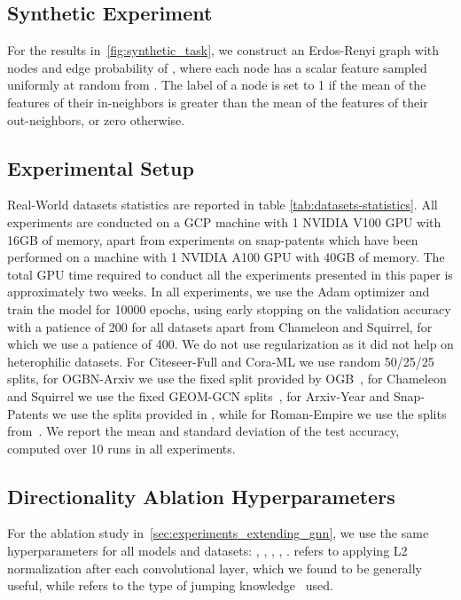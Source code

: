 \documentclass{article}
\theoremstyle{plain}
\theoremstyle{definition}
\theoremstyle{remark}
\begin{document}
\subsection{Synthetic Experiment}  \label{sec:appendix_synthetic_experiment}
For the results in~\cref{fig:synthetic_task}, we construct an Erdos-Renyi graph with  nodes and edge probability of , where each node has a scalar feature sampled uniformly at random from . The label of a node is set to 1 if the mean of the features of their in-neighbors is greater than the mean of the features of their out-neighbors, or zero otherwise. 

\subsection{Experimental Setup} \label{app:experimental_setup}
Real-World datasets statistics are reported in table \ref{tab:datasets-statistics}.
All experiments are conducted on a GCP machine with 1 NVIDIA V100 GPU with 16GB of memory, apart from experiments on snap-patents which have been performed on a machine with 1 NVIDIA A100 GPU with 40GB of memory. The total GPU time required to conduct all the experiments presented in this paper is approximately two weeks.
In all experiments, we use the Adam optimizer and train the model for 10000 epochs, using early stopping on the validation accuracy with a patience of 200 for all datasets apart from Chameleon and Squirrel, for which we use a patience of 400. We do not use regularization as it did not help on heterophilic datasets. For Citeseer-Full and Cora-ML we use random 50/25/25 splits, for OGBN-Arxiv we use the fixed split provided by OGB~\cite{hu2020ogb}, for Chameleon and Squirrel we use the fixed GEOM-GCN splits~\cite{pei2020geom}, for Arxiv-Year and Snap-Patents we use the splits provided in \citeauthor{lim2021large}, while for Roman-Empire we use the splits from~\citet{platonov2023a}. We report the mean and standard deviation of the test accuracy, computed over 10 runs in all experiments. 

\subsection{Directionality Ablation Hyperparameters} \label{sec:appendix_ablation_hyperparams}
For the ablation study in~\cref{sec:experiments_extending_gnn}, we use the same hyperparameters for all models and datasets: , , , , .  refers to applying L2 normalization after each convolutional layer, which we found to be generally useful, while  refers to the type of jumping knowledge~\cite{pmlr-v80-xu18c} used.
\end{document}
